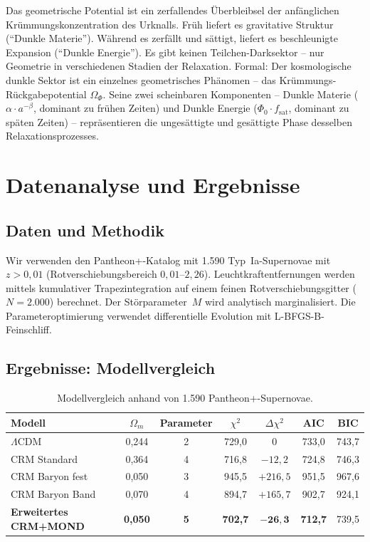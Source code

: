 \documentclass[aps,prd,twocolumn,superscriptaddress,nofootinbib]{revtex4-2}
\begin{document}
Das geometrische Potential ist ein zerfallendes \"Uberbleibsel der anf\"anglichen Kr\"ummungskonzentration des Urknalls. Fr\"uh liefert es gravitative Struktur ("`Dunkle Materie"'). W\"ahrend es zerf\"allt und s\"attigt, liefert es beschleunigte Expansion ("`Dunkle Energie"'). Es gibt keinen Teilchen-Darksektor -- nur Geometrie in verschiedenen Stadien der Relaxation. Formal: Der kosmologische dunkle Sektor ist ein einzelnes geometrisches Ph\"anomen -- das Kr\"ummungs-R\"uckgabepotential $\Omega_\Phi$. Seine zwei scheinbaren Komponenten -- Dunkle Materie ($\alpha \cdot a^{-\beta}$, dominant zu fr\"uhen Zeiten) und Dunkle Energie ($\Phi_0 \cdot f_{\mathrm{sat}}$, dominant zu sp\"aten Zeiten) -- repr\"asentieren die unges\"attigte und ges\"attigte Phase desselben Relaxationsprozesses.

\section{Datenanalyse und Ergebnisse}
\label{sec:analysis}

\subsection{Daten und Methodik}

Wir verwenden den Pantheon+-Katalog \cite{Scolnic2022} mit 1.590 Typ~Ia-Supernovae mit $z > 0{,}01$ (Rotverschiebungsbereich $0{,}01$--$2{,}26$). Leuchtkraftentfernungen werden mittels kumulativer Trapezintegration auf einem feinen Rotverschiebungsgitter ($N = 2.000$) berechnet. Der St\"orparameter~$M$ wird analytisch marginalisiert. Die Parameteroptimierung verwendet differentielle Evolution mit L-BFGS-B-Feinschliff.

\subsection{Ergebnisse: Modellvergleich}

\begin{table}
\centering
\caption{Modellvergleich anhand von 1.590 Pantheon+-Supernovae.}
\label{tab:comparison}
\begin{tabular}{lcccccc}
\toprule
\textbf{Modell} & $\Omega_m$ & \textbf{Parameter} & $\chi^2$ & $\Delta\chi^2$ & AIC & BIC \\
\midrule
$\Lambda$CDM & 0,244 & 2 & 729,0 & 0 & 733,0 & 743,7 \\
CRM Standard & 0,364 & 4 & 716,8 & $-12{,}2$ & 724,8 & 746,3 \\
\midrule
CRM Baryon fest & 0,050 & 3 & 945,5 & $+216{,}5$ & 951,5 & 967,6 \\
CRM Baryon Band & 0,070 & 4 & 894,7 & $+165{,}7$ & 902,7 & 924,1 \\
\midrule
\textbf{Erweitertes CRM+MOND} & \textbf{0,050} & \textbf{5} & \textbf{702,7} & $\mathbf{-26{,}3}$ & \textbf{712,7} & 739,5 \\
\bottomrule
\end{tabular}
\end{table}
\end{document}
